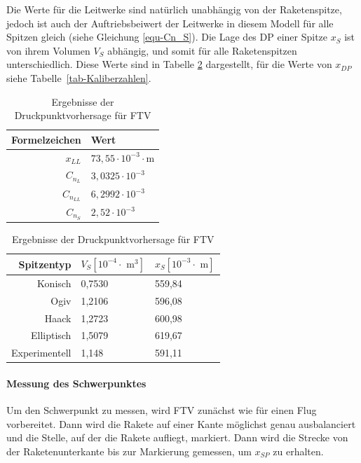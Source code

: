 \documentclass[10pt,a4paper]{article}
\begin{document}
\noindent
Die Werte für die Leitwerke sind natürlich unabhängig von der Raketenspitze, jedoch ist auch der Auftriebsbeiwert der Leitwerke in diesem Modell für alle Spitzen gleich (siehe Gleichung \eqref{equ-Cn_S}).
Die Lage des DP einer Spitze $x_{S}$ ist von ihrem Volumen $V_{S}$ abhängig, und somit für alle Raketenspitzen unterschiedlich. Diese Werte sind in Tabelle \ref{tab-Position-DP} dargestellt, für die Werte von $x_{DP}$ siehe Tabelle~\ref{tab-Kaliberzahlen}.

\begin{table}[h]
\caption{Ergebnisse der Druckpunktvorhersage für FTV}
\begin{subtable}[l]{0.49\textwidth}
	\begin{tabular}{r|l}
		\toprule
		Formelzeichen	& Wert	\\
		\midrule
		$x_{LL}$		& $73,55 \cdot 10^{-3} \cdot \text{m}$ \\
		$C_{n_{L}}$		& $3,0325 \cdot 10^{-3}$ \\
		$C_{n_{LL}}$	& $6,2992 \cdot 10^{-3}$ \\
		\midrule
		$C_{n_{S}}$		& $2,52 \cdot 10^{-3}$ \\
		\bottomrule
	\end{tabular}
\end{subtable}
\begin{subtable}[r]{0.49\textwidth}
	\begin{tabular}{r|ll}
	\toprule
	Spitzentyp	& $V_{S} [10^{-4} \cdot \text{ m}^{3}]$ &$x_{S} [10^{-3} \cdot \text{ m}]$  \\
	\midrule
	Konisch		& 0,7530 & 559,84 \\
	Ogiv		& 1,2106 & 596,08 \\
	Haack		& 1,2723 & 600,98 \\
	Elliptisch	& 1,5079 & 619,67 \\
	Experimentell&1,148  & 591,11 \\
	\bottomrule
	\end{tabular}
\label{tab-Position-DP}
\end{subtable}
\end{table}

\paragraph{Messung des Schwerpunktes}
Um den Schwerpunkt zu messen, wird FTV zunächst wie für einen Flug vorbereitet. Dann wird die Rakete auf einer Kante möglichst genau ausbalanciert und die Stelle, auf der die Rakete aufliegt, markiert. Dann wird die Strecke von der Raketenunterkante bis zur Markierung gemessen, um $x_{SP}$ zu erhalten.
\end{document}
